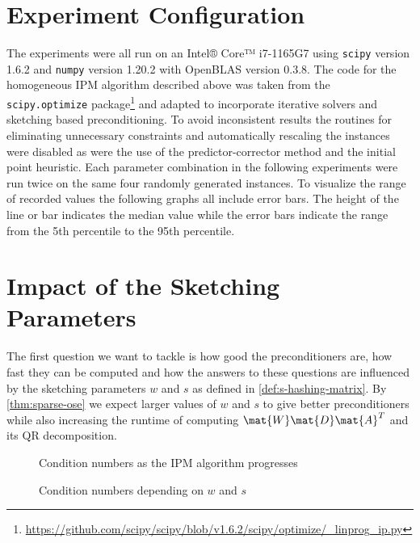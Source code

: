 \section{Experiment Configuration}

The experiments were all run on an Intel® Core™ i7-1165G7 using \texttt{scipy} version 1.6.2 and \texttt{numpy} version 1.20.2 with OpenBLAS version 0.3.8.
The code for the homogeneous IPM algorithm described above was taken from the \texttt{scipy.optimize} package\footnote{\url{https://github.com/scipy/scipy/blob/v1.6.2/scipy/optimize/_linprog_ip.py}} and adapted to incorporate iterative solvers and sketching based preconditioning.
To avoid inconsistent results the routines for eliminating unnecessary constraints and automatically rescaling the instances were disabled as were the use of the predictor-corrector method and the initial point heuristic.
Each parameter combination in the following experiments were run twice on the same four randomly generated instances.
To visualize the range of recorded values the following graphs all include error bars.
The height of the line or bar indicates the median value while the error bars indicate the range from the 5th percentile to the 95th percentile.

\section{Impact of the Sketching Parameters}

The first question we want to tackle is how good the preconditioners are, how fast they can be computed and how the answers to these questions are influenced by the sketching parameters \(w\) and \(s\) as defined in \cref{def:s-hashing-matrix}.
By \cref{thm:sparse-ose} we expect larger values of \(w\) and \(s\) to give better preconditioners while also increasing the runtime of computing \(\mat{W}\mat{D}\mat{A}^T\) and its QR decomposition.

\begin{figure}[tbp]
  \centering%
  \caption{Condition numbers as the IPM algorithm progresses}%
  \label{fig:condition_number_history}
\end{figure}

\begin{figure}[tbp]%
  \centering%
  \caption{Condition numbers depending on \(w\) and \(s\)}%
  \label{fig:condition_number}
\end{figure}%

